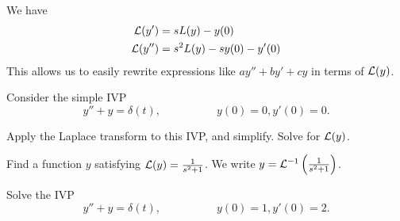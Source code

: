 \begin{applicationActivities}
\begin{observation}
We have
\begin{align*}
\mathcal{L}(y') &= sL(y)-y(0) \\
\mathcal{L}(y'') &= s^2L(y)-sy(0)-y'(0) 
\end{align*}
\vfill
This allows us to easily rewrite expressions like \(ay''+by'+cy\) in terms of \(\mathcal{L}(y)\).
\end{observation}

\begin{activity}{10}
Consider the simple IVP
\[y''+y=\delta(t),\hspace{5em} y(0)=0, y'(0)=0.\]
\begin{subactivity}
Apply the Laplace transform to this IVP, and simplify.  Solve for \(\mathcal{L}(y)\).
\end{subactivity}
\begin{subactivity}
Find a function \(y\) satisfying \(\mathcal{L}(y)=\frac{1}{s^2+1}\).  We write \(y=\mathcal{L}^{-1}\left(\frac{1}{s^2+1}\right)\).
\end{subactivity}
\end{activity}

\begin{activity}{15}
Solve the IVP
\[y''+y=\delta(t),\hspace{5em} y(0)=1, y'(0)=2.\]
\end{activity}



\end{applicationActivities}
